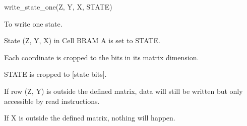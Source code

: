

\format
write\_state\_one(Z, Y, X, STATE)

\purpose

To write one state.

\description

State (Z, Y, X) in Cell BRAM A is set to STATE.

\notes

Each coordinate is cropped to the bits in its matrix dimension.

STATE is cropped to [state bits].

If row (Z, Y) is outside the defined matrix, data will still be written but only accessible by read instructions.

If X is outside the defined matrix, nothing will happen.
